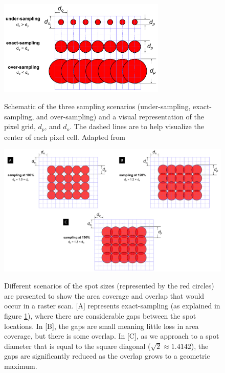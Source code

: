 \documentclass[12pt]{article}
\begin{document}
\begin{figure}[h!]
\begin{center}
{
 \includegraphics[width=0.71\textwidth]{figures/sampling.pdf}
}
\caption{\label{fig_sampling} Schematic of the three sampling scenarios (under-sampling, exact-sampling, and over-sampling) and a visual representation of the pixel grid, $d_p$, and $d_o$. The dashed lines are to help visualize the center of each pixel cell. Adapted from \citet{lifshin_improving_2014}}
\end{center}
\end{figure}

\begin{landscape}
\setlength{\belowcaptionskip}{-30pt}
\vspace*{\fill}
\begin{figure}[h!]
\begin{center}
{
 \includegraphics[width=1.3\textwidth]{figures/spot_ratio/sampling_ratios.pdf}
}
\caption{\label{fig_samp_ratios} Different scenarios of the spot sizes (represented by the red circles) are presented to show the area coverage and overlap that would occur in a raster scan. [A] represents exact-sampling (as explained in figure \ref{fig_sampling}), where there are considerable gaps between the spot locations. In [B], the gaps are small meaning little loss in area coverage, but there is some overlap. In [C], as we approach to a spot diameter that is equal to the square diagonal ($\sqrt{2} \approx 1.4142$), the gaps are significantly reduced as the overlap grows to a geometric maximum.}
\end{center}
\end{figure}
\vspace*{\fill}
\setlength{\belowcaptionskip}{10pt}
\end{landscape}
\end{document}
